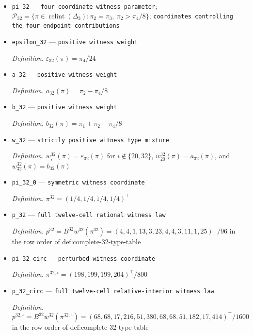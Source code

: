 \documentclass{article}
\begin{document}
\begin{itemize}
  \item \texttt{pi\_\allowbreak{}32} --- \texttt{four-\allowbreak{}coordinate witness parameter}; \(\mathcal P_{32}=\{\pi\in\operatorname{relint}(\Delta_3):\pi_2=\pi_3,\ \pi_2>\pi_4/8\}\); \texttt{coordinates controlling the four endpoint contributions}
  \item \texttt{epsilon\_\allowbreak{}32} --- \texttt{positive witness weight}
  \par\smallskip\noindent\emph{Definition.} \(\varepsilon_{32}(\pi)=\pi_4/24\)
  \item \texttt{a\_\allowbreak{}32} --- \texttt{positive witness weight}
  \par\smallskip\noindent\emph{Definition.} \(a_{32}(\pi)=\pi_2-\pi_4/8\)
  \item \texttt{b\_\allowbreak{}32} --- \texttt{positive witness weight}
  \par\smallskip\noindent\emph{Definition.} \(b_{32}(\pi)=\pi_1+\pi_2-\pi_4/8\)
  \item \texttt{w\_\allowbreak{}32} --- \texttt{strictly positive witness type mixture}
  \par\smallskip\noindent\emph{Definition.} \(w^{32}_i(\pi)=\varepsilon_{32}(\pi)\) for \(i\notin\{20,32\}\), \(w^{32}_{20}(\pi)=a_{32}(\pi)\), and \(w^{32}_{32}(\pi)=b_{32}(\pi)\)
  \item \texttt{pi\_\allowbreak{}32\_\allowbreak{}0} --- \texttt{symmetric witness coordinate}
  \par\smallskip\noindent\emph{Definition.} \(\pi^{32}=(1/4,1/4,1/4,1/4)^{\top}\)
  \item \texttt{p\_\allowbreak{}32} --- \texttt{full twelve-\allowbreak{}cell rational witness law}
  \par\smallskip\noindent\emph{Definition.} \(p^{32}=B^{32}w^{32}(\pi^{32})=(4,4,1,13,3,23,4,4,3,11,1,25)^{\top}/96\) in the row order of \(\text{def:complete-32-type-table}\)
  \item \texttt{pi\_\allowbreak{}32\_\allowbreak{}circ} --- \texttt{perturbed witness coordinate}
  \par\smallskip\noindent\emph{Definition.} \(\pi^{32,\circ}=(198,199,199,204)^{\top}/800\)
  \item \texttt{p\_\allowbreak{}32\_\allowbreak{}circ} --- \texttt{full twelve-\allowbreak{}cell relative-\allowbreak{}interior witness law}
  \par\smallskip\noindent\emph{Definition.} \(p^{32,\circ}=B^{32}w^{32}(\pi^{32,\circ})=(68,68,17,216,51,380,68,68,51,182,17,414)^{\top}/1600\) in the row order of \(\text{def:complete-32-type-table}\)

\end{itemize}
\end{document}
